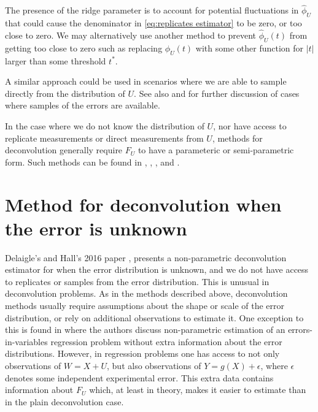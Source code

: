 
	The presence of the ridge parameter is to account for potential fluctuations in $\hat{\phi}_U$ that could cause the denominator in \eqref{eq:replicates estimator} to be zero, or too close to zero. We may alternatively use another method to prevent $\hat{\phi}_U(t)$ from getting too close to zero such as replacing $\hat{\phi}_U(t)$ with some other function for $|t|$ larger than some threshold $t^*$.

	A similar approach could be used in scenarios where we are able to sample directly from the distribution of $U$. See also \cite{Diggle1993-jy} and \cite{Neumann1997-cr} for further discussion of cases where samples of the errors are available.

	In the case where we do not know the distribution of $U$, nor have access to replicate measurements or direct measurements from $U$, methods for deconvolution generally require $F_U$ to have a parameteric or semi-parametric form. Such methods can be found in \cite{Butucea2005-be}, \cite{Meister2006-nu}, \cite{Butucea2008-wm}, and \cite{Kneip2012-aa}.
 
\section{Method for deconvolution when the error is unknown}
\label{sec:summary of delaigle hall}
	Delaigle's and Hall's 2016 paper \cite{Delaigle2016-la}, presents a non-parametric deconvolution estimator for when the error distribution is unknown, and we do not have access to replicates or samples from the error distribution. This is unusual in deconvolution problems. As in the methods described above, deconvolution methods usually require assumptions about the shape or scale of the error distribution, or rely on additional observations to estimate it. One exception to this is found in \cite{Schennach2013-yv} where the authors discuss non-parametric estimation of an errors-in-variables regression problem without extra information about the error distributions. However, in regression problems one has access to not only observations of $W = X+ U$, but also observations of $Y = g(X) + \epsilon$, where $\epsilon$ denotes some independent experimental error. This extra data contains information about $F_U$ which, at least in theory, makes it easier to estimate than in the plain deconvolution case.

